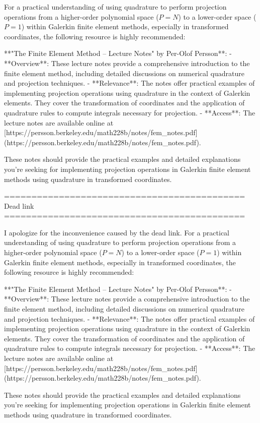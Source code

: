 For a practical understanding of using quadrature to perform projection operations from a higher-order polynomial space (\( P = N \)) to a lower-order space (\( P = 1 \)) within Galerkin finite element methods, especially in transformed coordinates, the following resource is highly recommended:

**"The Finite Element Method – Lecture Notes" by Per-Olof Persson**:
- **Overview**: These lecture notes provide a comprehensive introduction to the finite element method, including detailed discussions on numerical quadrature and projection techniques.
- **Relevance**: The notes offer practical examples of implementing projection operations using quadrature in the context of Galerkin elements. They cover the transformation of coordinates and the application of quadrature rules to compute integrals necessary for projection.
- **Access**: The lecture notes are available online at [https://persson.berkeley.edu/math228b/notes/fem_notes.pdf](https://persson.berkeley.edu/math228b/notes/fem_notes.pdf).

These notes should provide the practical examples and detailed explanations you're seeking for implementing projection operations in Galerkin finite element methods using quadrature in transformed coordinates. 

============================================
Dead link
============================================

I apologize for the inconvenience caused by the dead link. For a practical understanding of using quadrature to perform projection operations from a higher-order polynomial space (\( P = N \)) to a lower-order space (\( P = 1 \)) within Galerkin finite element methods, especially in transformed coordinates, the following resource is highly recommended:

**"The Finite Element Method – Lecture Notes" by Per-Olof Persson**:
- **Overview**: These lecture notes provide a comprehensive introduction to the finite element method, including detailed discussions on numerical quadrature and projection techniques.
- **Relevance**: The notes offer practical examples of implementing projection operations using quadrature in the context of Galerkin elements. They cover the transformation of coordinates and the application of quadrature rules to compute integrals necessary for projection.
- **Access**: The lecture notes are available online at [https://persson.berkeley.edu/math228b/notes/fem_notes.pdf](https://persson.berkeley.edu/math228b/notes/fem_notes.pdf).

These notes should provide the practical examples and detailed explanations you're seeking for implementing projection operations in Galerkin finite element methods using quadrature in transformed coordinates. 
